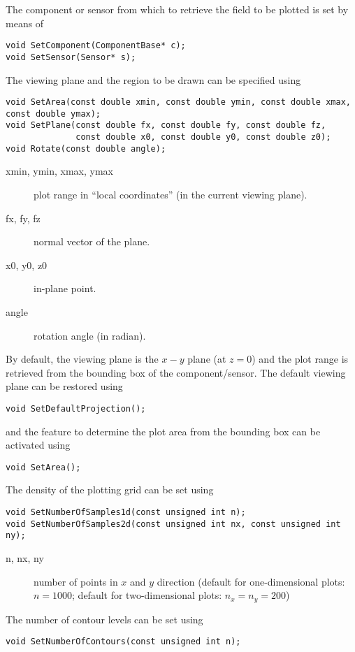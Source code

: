 The component or sensor from which to retrieve the field to be plotted 
is set by means of
\begin{lstlisting}
void SetComponent(ComponentBase* c);
void SetSensor(Sensor* s);
\end{lstlisting}

The viewing plane and the region to be drawn 
can be specified using
\begin{lstlisting}
void SetArea(const double xmin, const double ymin, const double xmax, const double ymax);
void SetPlane(const double fx, const double fy, const double fz,
              const double x0, const double y0, const double z0);
void Rotate(const double angle);
\end{lstlisting}
\begin{description}
  \item[xmin, ymin, xmax, ymax] plot range in ``local coordinates'' (in the current viewing plane).
  \item[fx, fy, fz] normal vector of the plane.
  \item[x0, y0, z0] in-plane point.
  \item[angle] rotation angle (in radian).
\end{description}
By default, the viewing plane is the $x-y$ plane (at $z = 0$) and the 
plot range is retrieved from the bounding box of the component/sensor.
The default viewing plane can be restored using 
\begin{lstlisting}
void SetDefaultProjection();
\end{lstlisting}
and the feature to determine the plot area from the bounding box can be activated using 
\begin{lstlisting}
void SetArea();
\end{lstlisting}
 
The density of the plotting grid can be set using
\begin{lstlisting}
void SetNumberOfSamples1d(const unsigned int n);
void SetNumberOfSamples2d(const unsigned int nx, const unsigned int ny);
\end{lstlisting}
\begin{description}
  \item[n, nx, ny]
  number of points in \(x\) and \(y\) direction 
  (default for one-dimensional plots: \(n = 1000\);
   default for two-dimensional plots: \(n_{x} = n_{y} = 200\)) 
\end{description}

The number of contour levels can be set using
\begin{lstlisting}
void SetNumberOfContours(const unsigned int n);
\end{lstlisting}

